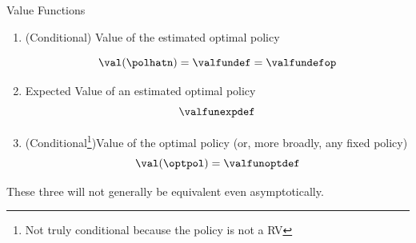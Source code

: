 \documentclass[aspectratio=169, professionalfonts]{beamer}
\begin{document}
\begin{frame}{Value Functions}
	\begin{enumerate}
		\item (Conditional) Value of the estimated optimal policy

		      $$\val(\polhatn) = \valfundef = \valfundefop$$

		      \vfill \pause

		\item Expected Value of an estimated optimal policy
		      $$\valfunexpdef$$

		      \vfill \pause

		\item (Conditional\footnote{Not truly conditional because the
			      policy is not a RV})Value of the optimal policy (or, more broadly, any fixed policy)
		      $$\val(\optpol) = \valfunoptdef$$
	\end{enumerate}

	\vfill \pause
	These three will not generally be equivalent even asymptotically.
\end{frame}

\end{document}
